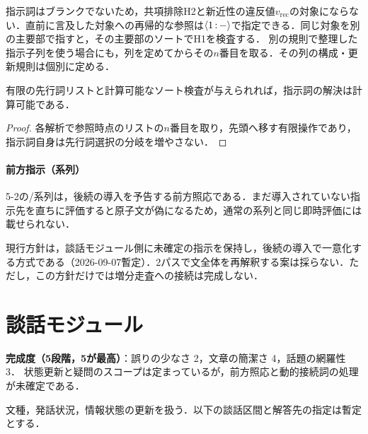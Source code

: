 \documentclass[../../main-detail.tex]{subfiles}
\begin{document}
\begin{remark}
    指示詞はブランクでないため，共項排除H2と新近性の違反値$v_{\mathrm{rec}}$の対象にならない．直前に言及した対象への再帰的な参照は$\mathopen{\langle}1\,{:}\,-\mathclose{\rangle}$で指定できる．同じ対象を別の主要部で指すと，その主要部のソートでH1を検査する．
    別の規則で整理した指示子列を使う場合にも，列を定めてからその$n$番目を取る．その列の構成・更新規則は個別に定める．
\end{remark}
\begin{proposition}
    有限の先行詞リストと計算可能なソート検査が与えられれば，指示詞の解決は計算可能である．
\end{proposition}
\begin{proof}
    各解析で参照時点のリストの$n$番目を取り，先頭へ移す有限操作であり，指示詞自身は先行詞選択の分岐を増やさない．
\end{proof}

\paragraph{前方指示（系列）}
5-2の/系列は，後続の導入を予告する前方照応である．まだ導入されていない指示先を直ちに評価すると原子文が偽になるため，通常の系列と同じ即時評価には載せられない．

現行方針は，談話モジュール側に未確定の指示を保持し，後続の導入で一意化する方式である（2026-09-07暫定）．2パスで文全体を再解釈する案は採らない．ただし，この方針だけでは増分走査への接続は完成しない．

\section{談話モジュール}\label{subsec:systemD}
\begin{leftwavybox}
\textbf{完成度（5段階，5が最高）}：誤りの少なさ 2，文章の簡潔さ 4，話題の網羅性 3．
状態更新と疑問のスコープは定まっているが，前方照応と動的接続詞の処理が未確定である．
\end{leftwavybox}
文種，発話状況，情報状態の更新を扱う．以下の談話区間と解答先の指定は暫定とする．
\end{document}

